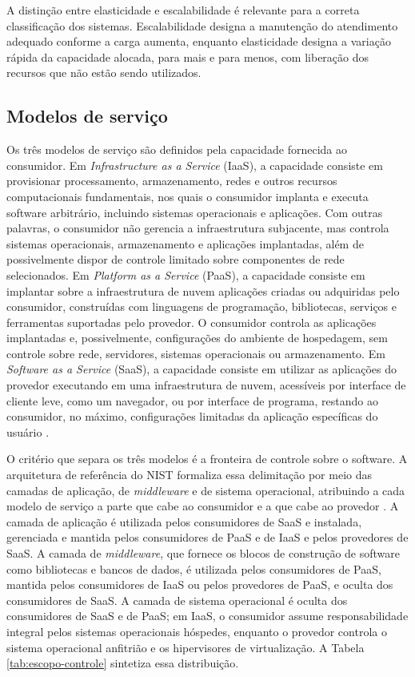 A distinção entre elasticidade e escalabilidade é relevante para a correta classificação dos sistemas. Escalabilidade designa a manutenção do atendimento adequado conforme a carga aumenta, enquanto elasticidade designa a variação rápida da capacidade alocada, para mais e para menos, com liberação dos recursos que não estão sendo utilizados.
\subsection{Modelos de serviço}

Os três modelos de serviço são definidos pela capacidade fornecida ao consumidor. Em \emph{Infrastructure as a Service} (IaaS), a capacidade consiste em provisionar processamento, armazenamento, redes e outros recursos computacionais fundamentais, nos quais o consumidor implanta e executa software arbitrário, incluindo sistemas operacionais e aplicações. Com outras palavras, o consumidor não gerencia a infraestrutura subjacente, mas controla sistemas operacionais, armazenamento e aplicações implantadas, além de possivelmente dispor de controle limitado sobre componentes de rede selecionados. Em \emph{Platform as a Service} (PaaS), a capacidade consiste em implantar sobre a infraestrutura de nuvem aplicações criadas ou adquiridas pelo consumidor, construídas com linguagens de programação, bibliotecas, serviços e ferramentas suportadas pelo provedor. O consumidor controla as aplicações implantadas e, possivelmente, configurações do ambiente de hospedagem, sem controle sobre rede, servidores, sistemas operacionais ou armazenamento. Em \emph{Software as a Service} (SaaS), a capacidade consiste em utilizar as aplicações do provedor executando em uma infraestrutura de nuvem, acessíveis por interface de cliente leve, como um navegador, ou por interface de programa, restando ao consumidor, no máximo, configurações limitadas da aplicação específicas do usuário \cite{mell2011nist}.

O critério que separa os três modelos é a fronteira de controle sobre o software. A arquitetura de referência do NIST formaliza essa delimitação por meio das camadas de aplicação, de \emph{middleware} e de sistema operacional, atribuindo a cada modelo de serviço a parte que cabe ao consumidor e a que cabe ao provedor \cite{liu2011nist}. A camada de aplicação é utilizada pelos consumidores de SaaS e instalada, gerenciada e mantida pelos consumidores de PaaS e de IaaS e pelos provedores de SaaS. A camada de \emph{middleware}, que fornece os blocos de construção de software como bibliotecas e bancos de dados, é utilizada pelos consumidores de PaaS, mantida pelos consumidores de IaaS ou pelos provedores de PaaS, e oculta dos consumidores de SaaS. A camada de sistema operacional é oculta dos consumidores de SaaS e de PaaS; em IaaS, o consumidor assume responsabilidade integral pelos sistemas operacionais hóspedes, enquanto o provedor controla o sistema operacional anfitrião e os hipervisores de virtualização. A Tabela \ref{tab:escopo-controle} sintetiza essa distribuição.

